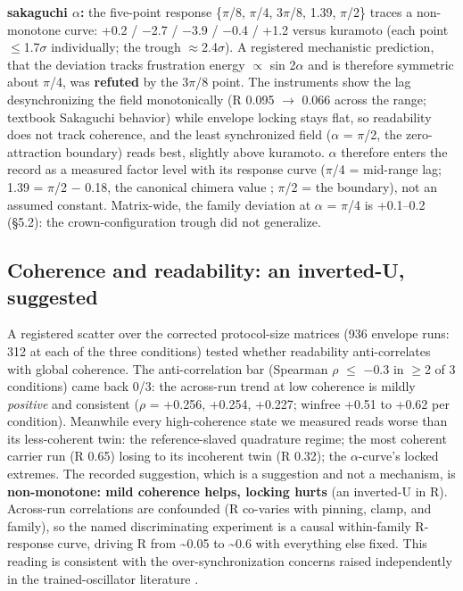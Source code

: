 \documentclass[10pt]{article}
\begin{document}
\textbf{sakaguchi \ensuremath{\alpha}:} the five-point response
\{\ensuremath{\pi}/8, \ensuremath{\pi}/4, 3\ensuremath{\pi}/8, 1.39,
\ensuremath{\pi}/2\} traces a non-monotone curve: +0.2 /
\ensuremath{-}2.7 / \ensuremath{-}3.9 / \ensuremath{-}0.4 / +1.2 versus
kuramoto (each point \ensuremath{\leq}1.7\ensuremath{\sigma}
individually; the trough \ensuremath{\approx}2.4\ensuremath{\sigma}). A
registered mechanistic prediction, that the deviation tracks frustration
energy \ensuremath{\propto} sin 2\ensuremath{\alpha} and is therefore
symmetric about \ensuremath{\pi}/4, was \textbf{refuted} by the
3\ensuremath{\pi}/8 point. The instruments show the lag desynchronizing
the field monotonically (R 0.095 \ensuremath{\to} 0.066 across the
range; textbook Sakaguchi behavior) while envelope locking stays flat,
so readability does not track coherence, and the least synchronized
field (\ensuremath{\alpha} = \ensuremath{\pi}/2, the zero-attraction
boundary) reads best, slightly above kuramoto. \ensuremath{\alpha}
therefore enters the record as a measured factor level with its response
curve (\ensuremath{\pi}/4 = mid-range lag; 1.39 = \ensuremath{\pi}/2
\ensuremath{-} 0.18, the canonical chimera value \citep{abrams2004};
\ensuremath{\pi}/2 = the boundary), not an assumed constant.
Matrix-wide, the family deviation at \ensuremath{\alpha} =
\ensuremath{\pi}/4 is +0.1--0.2 (§5.2): the crown-configuration trough
did not generalize.

\subsection{Coherence and readability: an inverted-U,
suggested}\label{coherence-and-readability-an-inverted-u-suggested}

A registered scatter over the corrected protocol-size matrices (936
envelope runs: 312 at each of the three conditions) tested whether
readability anti-correlates with global coherence. The anti-correlation
bar (Spearman \ensuremath{\rho} \ensuremath{\leq} \ensuremath{-}0.3 in
\ensuremath{\geq}2 of 3 conditions) came back 0/3: the across-run trend
at low coherence is mildly \emph{positive} and consistent
(\ensuremath{\rho} = +0.256, +0.254, +0.227; winfree +0.51 to +0.62 per
condition). Meanwhile every high-coherence state we measured reads worse
than its less-coherent twin: the reference-slaved quadrature regime; the
most coherent carrier run (R 0.65) losing to its incoherent twin (R
0.32); the \ensuremath{\alpha}-curve's locked extremes. The recorded
suggestion, which is a suggestion and not a mechanism, is
\textbf{non-monotone: mild coherence helps, locking hurts} (an
inverted-U in R). Across-run correlations are confounded (R co-varies
with pinning, clamp, and family), so the named discriminating experiment
is a causal within-family R-response curve, driving R from
\textasciitilde0.05 to \textasciitilde0.6 with everything else fixed.
This reading is consistent with the over-synchronization concerns raised
independently in the trained-oscillator literature
\citep{unconv-ai2026, nunley2026}.
\end{document}
